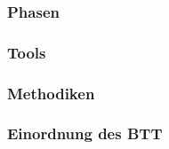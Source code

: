 \subsubsection{Phasen}

\subsubsection{Tools}

\subsubsection{Methodiken}

\subsubsection{Einordnung des BTT}